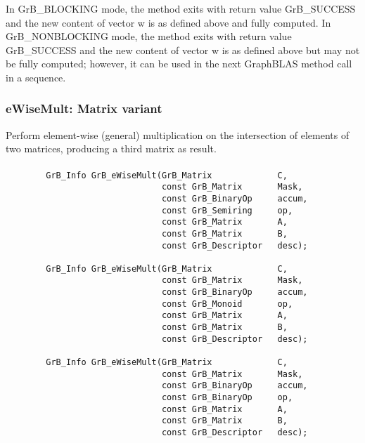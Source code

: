 In {\sf GrB\_BLOCKING} mode, the method exits with return value 
{\sf GrB\_SUCCESS} and the new content of vector {\sf w} is as defined above
and fully computed.  
In {\sf GrB\_NONBLOCKING} mode, the method exits with return value 
{\sf GrB\_SUCCESS} and the new content of vector {\sf w} is as defined above 
but may not be fully computed; however, it can be used in the next GraphBLAS 
method call in a sequence.



\subsubsection{{\sf eWiseMult}: Matrix variant}

Perform element-wise (general) multiplication on the intersection of elements 
of two matrices, producing a third matrix as result.

\paragraph{\syntax}

\begin{verbatim}
        GrB_Info GrB_eWiseMult(GrB_Matrix             C,
                               const GrB_Matrix       Mask,
                               const GrB_BinaryOp     accum,
                               const GrB_Semiring     op, 
                               const GrB_Matrix       A,
                               const GrB_Matrix       B,
                               const GrB_Descriptor   desc);
                            
        GrB_Info GrB_eWiseMult(GrB_Matrix             C,
                               const GrB_Matrix       Mask,
                               const GrB_BinaryOp     accum,
                               const GrB_Monoid       op, 
                               const GrB_Matrix       A,
                               const GrB_Matrix       B,
                               const GrB_Descriptor   desc);
                            
        GrB_Info GrB_eWiseMult(GrB_Matrix             C,
                               const GrB_Matrix       Mask,
                               const GrB_BinaryOp     accum,
                               const GrB_BinaryOp     op, 
                               const GrB_Matrix       A,
                               const GrB_Matrix       B,
                               const GrB_Descriptor   desc);
\end{verbatim}

